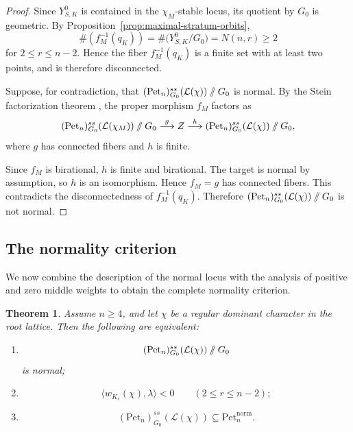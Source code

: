 \documentclass[12pt, reqno]{amsart}
\newcommand{\sslash}{\mathbin{/\mkern-6mu/}}
\theoremstyle{plain}
\numberwithin{equation}{section}
\newtheorem{theorem}{Theorem}[section]
\theoremstyle{definition}
\begin{document}
\begin{proof}
Since \(Y^0_{S,K}\) is contained in the \(\chi_M\)-stable locus, its
quotient by \(G_0\) is geometric.
By
Proposition~\ref{prop:maximal-stratum-orbits},
\[ \#(f_M^{-1}(q_K))=
\#\bigl(Y^0_{S,K}/G_0\bigr)
=
N(n,r)\ge2
\]
for \(2\le r\le n-2\). Hence the fiber
\(f_M^{-1}(q_K)\) is a finite set with at least two points, and is
therefore disconnected.

Suppose, for contradiction, that $(\mathrm{Pet}_n)^{ss}_{G_0}(\mathcal L(\chi))
\sslash G_0$
is normal. By the Stein factorization theorem
\cite[Chapter~III, Corollary~11.5]{Hart}, the proper morphism \(f_M\)
factors as
\[
(\mathrm{Pet}_n)^{ss}_{G_0}(\mathcal L(\chi_M))
\sslash G_0
\overset{g}{\longrightarrow}
Z
\overset{h}{\longrightarrow}
(\mathrm{Pet}_n)^{ss}_{G_0}(\mathcal L(\chi))
\sslash G_0,
\]
where \(g\) has connected fibers and \(h\) is finite.

Since \(f_M\) is birational, \(h\) is finite and birational. The
target is normal by assumption, so \(h\) is an isomorphism. Hence
\(f_M=g\) has connected fibers. This contradicts the disconnectedness
of \(f_M^{-1}(q_K)\). Therefore $(\mathrm{Pet}_n)^{ss}_{G_0}(\mathcal L(\chi))
\sslash G_0$
is not normal.
\end{proof}

\subsection{The normality criterion} We now combine the description of the normal locus with the analysis of
positive and zero middle weights to obtain the complete normality
criterion.

\begin{theorem}\label{thm:normality-criterion} 
Assume \(n\ge4\), and let \(\chi\) be a regular dominant character in the root lattice. Then the following are equivalent:
\begin{enumerate}
\item
\[
(\mathrm{Pet}_n)^{ss}_{G_0}(\mathcal L(\chi))
\sslash G_0
\]
is normal;

\item
\[
\langle w_{K_r}(\chi),\lambda\rangle<0
\qquad
(2\le r\le n-2);
\]

\item
\[
(\mathrm{Pet}_n)^{ss}_{G_0}(\mathcal L(\chi))
\subseteq
\mathrm{Pet}_n^{\mathrm{norm}}.
\]
\end{enumerate}
\end{theorem}
\end{document}
